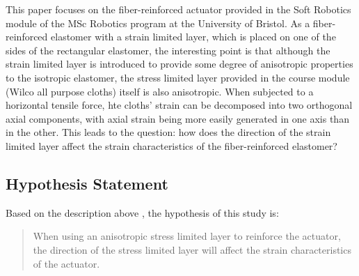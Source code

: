 \documentclass[conference]{IEEEtran}
\begin{document}
This paper focuses on the fiber-reinforced actuator provided in the Soft Robotics module of the MSc Robotics program at the University of Bristol. As a fiber-reinforced elastomer with a strain limited layer\cite{stress_constraint_layer}, which is placed on one of the sides of the rectangular elastomer, the interesting point is that although the strain limited layer is introduced to provide some degree of anisotropic properties to the isotropic elastomer, the stress limited layer provided in the course module  (Wilco all purpose cloths) itself is also anisotropic. When subjected to a horizontal tensile force, hte cloths' strain can be decomposed into two orthogonal axial components, with axial strain being more easily generated in one axis than in the other. This leads to the question: how does the direction of the strain limited layer affect the strain characteristics of the fiber-reinforced elastomer?


\subsection{Hypothesis Statement}


Based on the description above , the hypothesis of this study is:
\begin{quote}
When using an anisotropic stress limited layer to reinforce the actuator, the direction of the stress limited layer will affect the strain characteristics of the actuator.
\end{quote}

\end{document}
